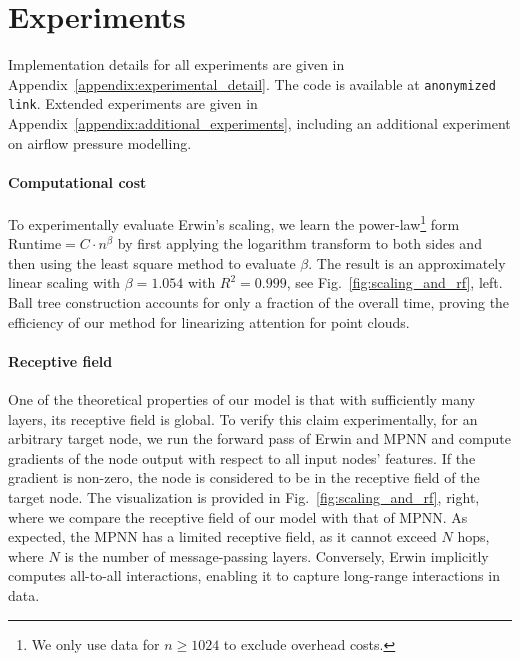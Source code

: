 \vspace{-10pt}
\section{Experiments}

Implementation details for all experiments are given in Appendix~\ref{appendix:experimental_detail}. The code is available at \texttt{anonymized link}. Extended experiments are given in Appendix~\ref{appendix:additional_experiments}, including an additional experiment on airflow pressure modelling.


\vspace{-5pt}
\paragraph{Computational cost}
To experimentally evaluate Erwin's scaling, we learn the power-law\footnote{We only use data for $n \geq 1024$ to exclude overhead costs.} form $\mathrm{Runtime} = C \cdot n^\beta$ by first applying the logarithm transform to both sides and then using the least square method to evaluate $\beta$. The result is an approximately linear scaling with $\beta = 1.054$ with $R^2 = 0.999$, see Fig.~\ref{fig:scaling_and_rf}, left. Ball tree construction accounts for only a fraction of the overall time, proving the efficiency of our method for linearizing attention for point clouds.

\vspace{-5pt}
\paragraph{Receptive field}
One of the theoretical properties of our model is that with sufficiently many layers, its receptive field is global. To verify this claim experimentally, for an arbitrary target node, we run the forward pass of Erwin and MPNN and compute gradients of the node output with respect to all input nodes' features. If the gradient is non-zero, the node is considered to be in the receptive field of the target node. The visualization is provided in Fig.~\ref{fig:scaling_and_rf}, right, where we compare the receptive field of our model with that of MPNN. As expected, the MPNN has a limited receptive field, as it cannot exceed $N$ hops, where $N$ is the number of message-passing layers. Conversely, Erwin implicitly computes all-to-all interactions, enabling it to capture long-range interactions in data.


\vspace{-5pt}
